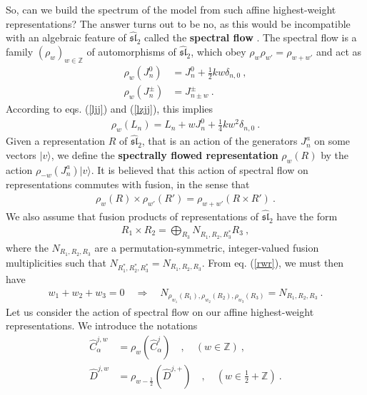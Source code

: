 \documentclass[12pt,a4paper,notitlepage]{report}
\newcommand \Z {\mathbb{Z}}
\numberwithin{equation}{section}
\theoremstyle{break}
\begin{document}
So, can we build the spectrum of the model from such affine highest-weight representations?
The answer turns out to be no, as this would be incompatible with an algebraic feature of $\widehat{\mathfrak{sl}}_2$ called the \textbf{\boldmath spectral flow} \cite{mo00a}. The spectral flow is a family $(\rho_w)_{w\in\Z}$ of automorphisms of $\widehat{\mathfrak{sl}}_2$, which obey $\rho_w\rho_{w'}=\rho_{w+w'}$ and act as 
\begin{align}
 \rho_w(J^0_n)&=  J^0_n + \frac12 kw \delta_{n,0}   \ ,
\\
 \rho_w(J^\pm_n) &= J^\pm_{n\pm w}  \ .
\end{align}
According to eqs. (\ref{ljj}) and (\ref{lzjj}), this implies
\begin{align}
 \rho_w(L_n)  = L_n + wJ^0_n +\frac14 kw^2 \delta_{n,0}\ .
\end{align}
Given a representation $R$ of $\widehat{\mathfrak{sl}}_2$, that is an action of the generators $J^a_n$ on some vectors $|v\rangle$, we define the \textbf{\boldmath spectrally flowed representation} $\rho_w(R)$ by the action $\rho_{-w}(J^a_n)|v\rangle$.  
It is believed that this action of spectral flow on representations commutes with fusion, in the sense that \cite{gab01b}
\begin{align}
 \rho_{w}(R)\times \rho_{w'}(R') = \rho_{w+w'}(R\times R')\ .
\label{rwr}
\end{align}
We also assume that fusion products of representations of $\widehat{\mathfrak{sl}}_2$ have the form 
\begin{align}
 R_1\times R_2 = \bigoplus_{R_3} N_{R_1,R_2,R_3^*} R_3\ ,
\end{align}
where the $N_{R_1,R_2,R_3}$ are a permutation-symmetric, integer-valued fusion multiplicities such that $N_{R_1^*,R_2^*,R_3^*}=N_{R_1,R_2,R_3}$. From eq. (\ref{rwr}), we must then have 
\begin{align}
w_1+w_2+w_3=0 \quad \Rightarrow \quad N_{\rho_{w_1}(R_1),\rho_{w_2}(R_2),\rho_{w_3}(R_3)}=N_{R_1,R_2,R_3}\ .
\label{nrrr} 
\end{align}
Let us consider the action of spectral flow on our affine highest-weight representations. 
We introduce the notations 
\begin{align}
 \hat{C}^{j,w}_\alpha &= \rho_w(\hat{C}^j_\alpha) \quad , \quad (w\in\Z)\ ,
\\
\hat{D}^{j,w} &= \rho_{w-\frac12}(\hat{D}^{j,+})\quad , \quad (w\in \tfrac12+\Z)\ .
\end{align}
\end{document}
